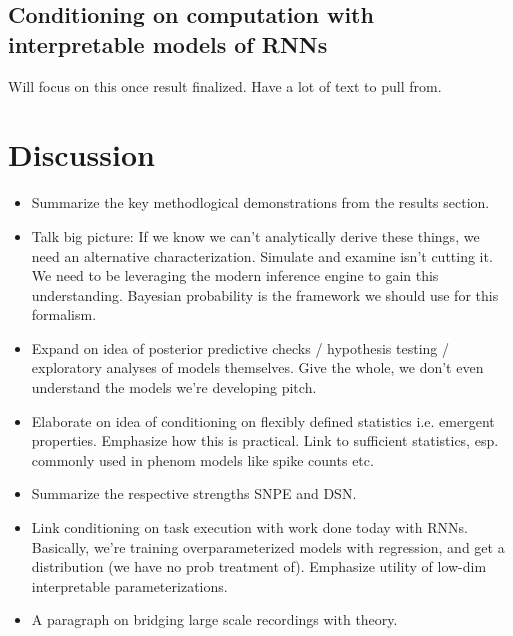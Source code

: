 \documentclass[11pt]{article}
\begin{document}
\subsection{Conditioning on computation with interpretable models of RNNs}
Will focus on this once result finalized.  Have a lot of text to pull from.

\section{Discussion}
\begin{itemize}
\item Summarize the key methodlogical demonstrations from the results section.
\item Talk big picture: If we know we can't analytically derive these things, we need an alternative characterization.  Simulate and examine isn't cutting it.  We need to be leveraging the modern inference engine to gain this understanding.  Bayesian probability is the framework we should use for this formalism.
\item Expand on idea of posterior predictive checks / hypothesis testing / exploratory analyses of models themselves.  Give the whole, we don't even understand the models we're developing pitch.
\item Elaborate on idea of conditioning on flexibly defined statistics i.e. emergent properties. Emphasize how this is practical.  Link to sufficient statistics, esp. commonly used in phenom models like spike counts etc.
\item Summarize the respective strengths SNPE and DSN.
\item Link conditioning on task execution with work done today with RNNs.  Basically, we're training overparameterized models with regression, and get a distribution (we have no prob treatment of). Emphasize utility of low-dim interpretable parameterizations.
\item A paragraph on bridging large scale recordings with theory.
\end{itemize}



\end{document}
